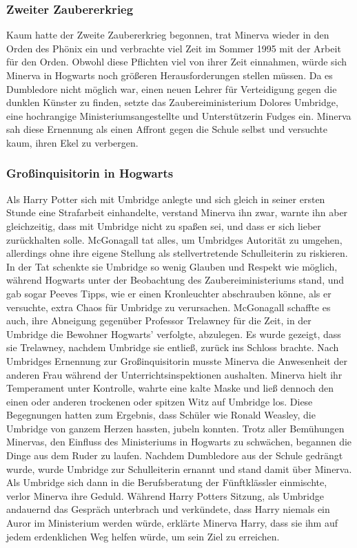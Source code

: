 \documentclass[a4paper, 10pt]{article}
\begin{document}
\subsubsection*{\large Zweiter Zaubererkrieg}
Kaum hatte der Zweite Zaubererkrieg begonnen, trat Minerva wieder in den Orden des Phönix ein und verbrachte viel Zeit im Sommer 1995 mit der Arbeit für den Orden. Obwohl diese Pflichten viel von ihrer Zeit einnahmen, würde sich Minerva in Hogwarts noch größeren Herausforderungen stellen müssen. Da es Dumbledore nicht möglich war, einen neuen Lehrer für Verteidigung gegen die dunklen Künster zu finden, setzte das Zaubereiministerium Dolores Umbridge, eine  hochrangige Ministeriumsangestellte und Unterstützerin Fudges ein. Minerva sah diese Ernennung als einen Affront gegen die Schule selbst und versuchte kaum, ihren Ekel zu verbergen.
\subsubsection*{\large Großinquisitorin in Hogwarts}
Als Harry Potter sich mit Umbridge anlegte und sich gleich in seiner ersten Stunde eine Strafarbeit einhandelte, verstand Minerva ihn zwar, warnte ihn aber gleichzeitig, dass mit Umbridge nicht zu spaßen sei, und dass er sich lieber zurückhalten solle. McGonagall tat alles, um Umbridges Autorität zu umgehen, allerdings ohne ihre eigene Stellung als stellvertretende Schulleiterin zu riskieren. In der Tat schenkte sie Umbridge so wenig Glauben und Respekt wie möglich, während Hogwarts unter der Beobachtung des Zaubereiministeriums stand, und gab sogar Peeves Tipps, wie er einen Kronleuchter abschrauben könne, als er versuchte, extra Chaos für Umbridge zu verursachen. McGonagall schaffte es auch, ihre Abneigung gegenüber Professor Trelawney für die Zeit, in der Umbridge die Bewohner Hogwarts' verfolgte, abzulegen. Es wurde gezeigt, dass sie Trelawney, nachdem Umbridge sie entließ, zurück ins Schloss brachte.
\vspace{10pt}
\newline
{}  
Nach Umbridges Ernennung zur Großinquisitorin musste Minerva die Anwesenheit der anderen Frau während der Unterrichtsinspektionen aushalten. Minerva hielt ihr Temperament unter Kontrolle, wahrte eine kalte Maske und ließ dennoch den einen oder anderen trockenen oder spitzen Witz auf Umbridge los. Diese Begegnungen hatten zum Ergebnis, dass Schüler wie Ronald Weasley, die Umbridge von ganzem Herzen hassten, jubeln konnten.
\vspace{10pt}
\newline
{}  
Trotz aller Bemühungen Minervas, den Einfluss des Ministeriums in Hogwarts zu schwächen, begannen die Dinge aus dem Ruder zu laufen. Nachdem Dumbledore aus der Schule gedrängt wurde, wurde Umbridge zur Schulleiterin ernannt und stand damit über Minerva. Als Umbridge sich dann in die Berufsberatung der Fünftklässler einmischte, verlor Minerva ihre Geduld. Während Harry Potters Sitzung, als Umbridge andauernd das Gespräch unterbrach und verkündete, dass Harry niemals ein Auror im Ministerium werden würde, erklärte Minerva Harry, dass sie ihm auf jedem erdenklichen Weg helfen würde, um sein Ziel zu erreichen.
\end{document}
